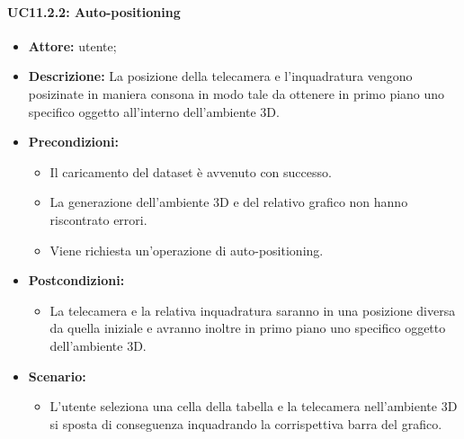 \paragraph{UC11.2.2: Auto-positioning}
\begin{itemize}    
    \item \textbf{Attore:} utente;
    \item \textbf{Descrizione:} La posizione della telecamera e l'inquadratura vengono posizinate in maniera consona in modo tale da ottenere in primo piano uno specifico oggetto all'interno dell'ambiente 3D.
    \item \textbf{Precondizioni:}    
        \begin{itemize}
            \item Il caricamento del dataset è avvenuto con successo.
            \item La generazione dell'ambiente 3D e del relativo grafico non hanno riscontrato errori.
            \item Viene richiesta un'operazione di auto-positioning.
        \end{itemize}    
    \item \textbf{Postcondizioni:}
        \begin{itemize}
            \item La telecamera e la relativa inquadratura saranno in una posizione diversa da quella iniziale e avranno inoltre in primo piano uno specifico oggetto dell'ambiente 3D.
        \end{itemize}    
    \item \textbf{Scenario:} 
        \begin{itemize}
            \item L'utente seleziona una cella della tabella e la telecamera nell'ambiente 3D si sposta di conseguenza inquadrando la corrispettiva barra del grafico.
        \end{itemize}
\end{itemize}

